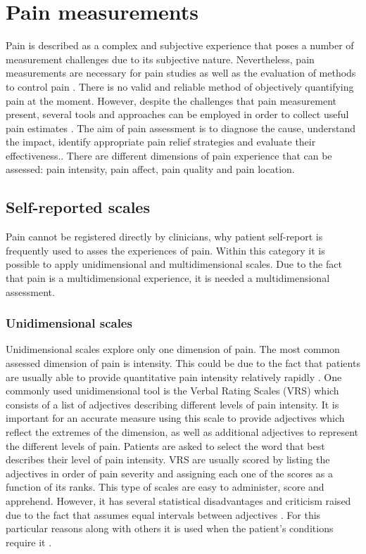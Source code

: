 \section{Pain measurements}
Pain is described as a complex and subjective experience that poses a number of measurement challenges due to its subjective nature. Nevertheless, pain measurements are necessary for pain studies as well as the evaluation of methods to control pain \cite{libro pain}.
There is no valid and reliable method of objectively quantifying pain at the moment. However, despite the challenges that pain measurement present, several tools and approaches can be employed in order to collect useful pain estimates \cite{pain outcomes paper}. The aim of pain assessment is to diagnose the cause, understand the impact, identify appropriate pain relief strategies and evaluate their effectiveness.\cite{art and science}. There are different dimensions of pain experience that can be assessed: pain intensity, pain affect, pain quality and pain location. %


\subsection{Self-reported scales}
Pain cannot be registered directly by clinicians, why patient self-report is frequently used to asses the experiences of pain\cite{libro pain}. Within this category it is possible to apply unidimensional and multidimensional scales. Due to the fact that pain is a multidimensional experience, it is needed a multidimensional assessment.


\subsubsection{Unidimensional scales}
Unidimensional scales explore only one dimension of pain. The most common assessed dimension of pain is intensity. This could be due to the fact that patients are usually able to provide quantitative pain intensity relatively rapidly \cite{libro pain}. One commonly used unidimensional tool is the Verbal Rating Scales (VRS) which consists of a list of adjectives describing different levels of pain intensity. It is important for an accurate measure using this scale to provide adjectives which reflect the extremes of the dimension, as well as additional adjectives to represent the different levels of pain. Patients are asked to select the word that best describes their level of pain intensity. VRS are usually scored by listing the adjectives in order of pain severity and assigning each one of the scores as a function of its ranks. This type of scales are easy to administer, score and apprehend. However, it has several statistical disadvantages and criticism raised due to the fact that assumes equal intervals between adjectives \cite{libro pain}. For this particular reasons along with others it is used when the patient's conditions require it \cite{six methods paper}. 

